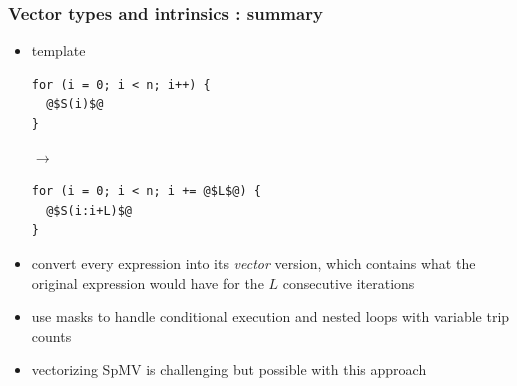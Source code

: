 \documentclass[12pt,dvipdfmx]{beamer}
\begin{document}
\begin{frame}[fragile]
  \frametitle{Vector types and intrinsics : summary}
  \begin{itemize}
  \item template
\begin{lstlisting}
for (i = 0; i < n; i++) {
  @$S(i)$@
}
\end{lstlisting}
$\rightarrow$
\begin{lstlisting}
for (i = 0; i < n; i += @$L$@) {
  @$S(i:i+L)$@
}
\end{lstlisting}

\item convert every expression into its {\it vector} version,
  which contains what the original expression would have for the
  $L$ consecutive iterations

\item use masks to handle conditional execution and nested loops
  with variable trip counts

\item vectorizing SpMV is challenging but possible with this approach
\end{itemize}
\end{frame}
\end{document}
